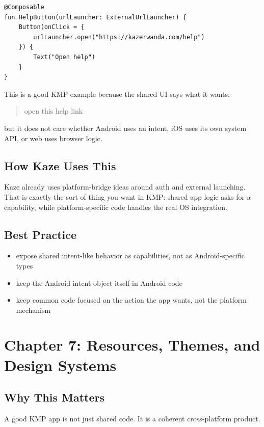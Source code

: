 \documentclass[11pt,a4paper]{article}
\begin{document}
\begin{lstlisting}[style=kazekotlin]
@Composable
fun HelpButton(urlLauncher: ExternalUrlLauncher) {
    Button(onClick = {
        urlLauncher.open("https://kazerwanda.com/help")
    }) {
        Text("Open help")
    }
}
\end{lstlisting}

This is a good KMP example because the shared UI says what it wants:
\begin{quote}
open this help link
\end{quote}

but it does not care whether Android uses an intent, iOS uses its own system API, or web uses browser logic.

\subsection{How Kaze Uses This}

Kaze already uses platform-bridge ideas around auth and external launching. That is exactly the sort of thing you want in KMP: shared app logic asks for a capability, while platform-specific code handles the real OS integration.

\subsection{Best Practice}

\begin{itemize}
    \item expose shared intent-like behavior as capabilities, not as Android-specific types
    \item keep the Android intent object itself in Android code
    \item keep common code focused on the action the app wants, not the platform mechanism
\end{itemize}

\section{Chapter 7: Resources, Themes, and Design Systems}

\subsection{Why This Matters}

A good KMP app is not just shared code. It is a coherent cross-platform product.
\end{document}
